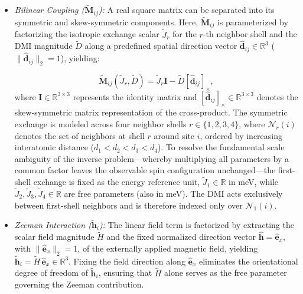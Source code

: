 \documentclass[final,5p,times,twocolumn]{elsarticle}
\begin{document}
\begin{itemize}

    \item[--] \emph{Bilinear Coupling ($\tilde{\mathbf{M}}_{ij}$):} A 
    real square matrix can be separated into its symmetric and skew-symmetric components. Here, 
    $\tilde{\mathbf{M}}_{ij}$ is parameterized by factorizing the isotropic exchange scalar $\tilde{J}_r$ for the $r$-th neighbor shell and the DMI magnitude $\tilde{D}$ along a predefined spatial direction vector $\hat{\mathbf{d}}_{ij} \in \mathbb{R}^3$ 
    ($\|\hat{\mathbf{d}}_{ij}\|_2=1$), yielding:
    
    \begin{equation}\label{eq:MatrixDecomposition}
    \tilde{\mathbf{M}}_{ij}(\tilde{J}_r,\tilde{D}) = 
        \tilde{J}_r \mathbf{I} - \tilde{D} [\hat{\mathbf{d}}_{ij}]_{\times},
    \end{equation}
    where $\mathbf{I} \in \mathbb{R}^{3 \times 3}$ represents the identity matrix and 
    $[\hat{\mathbf{d}}_{ij}]_{\times} \in \mathbb{R}^{3 \times 3}$ denotes the skew-symmetric matrix representation of the cross-product. The symmetric exchange is modeled across four neighbor shells $r \in \{1,2,3,4\}$, where $\mathcal{N}_r(i)$ denotes the 
    set of neighbors at shell $r$ around site $i$, ordered by 
    increasing interatomic distance ($d_1 < d_2 < d_3 < d_4$). To resolve the fundamental scale ambiguity of the inverse problem---whereby multiplying all parameters by a common factor leaves the observable spin configuration unchanged---the first-shell exchange is fixed as the energy reference unit, $\tilde{J}_1\in \mathbb{R}$ in meV, while $\tilde{J}_2, \tilde{J}_3, \tilde{J}_4 \in \mathbb{R}$ are free parameters (also in meV). The DMI acts exclusively between first-shell neighbors and is therefore indexed only over $\mathcal{N}_1(i)$.

    \item[--] \emph{Zeeman Interaction ($\tilde{\mathbf{h}}_i$):} The linear field term is factorized by extracting the scalar field magnitude $\tilde{H}$ and the fixed normalized direction vector 
    $\hat{\mathbf{h}} = \hat{\mathbf{e}}_x,$ with 
    $\|\hat{\mathbf{e}}_x\|_2 = 1$, of the externally applied 
    magnetic field, yielding $\tilde{\mathbf{h}}_i = \tilde{H}\,\hat{\mathbf{e}}_x\in\mathbb{R}^3$. Fixing the field direction along $\hat{\mathbf{e}}_x$ eliminates the orientational degree of freedom of $\tilde{\mathbf{h}}_i$, ensuring that $\tilde{H}$ alone serves as the free parameter governing the Zeeman 
    contribution.


\end{itemize}
\end{document}
